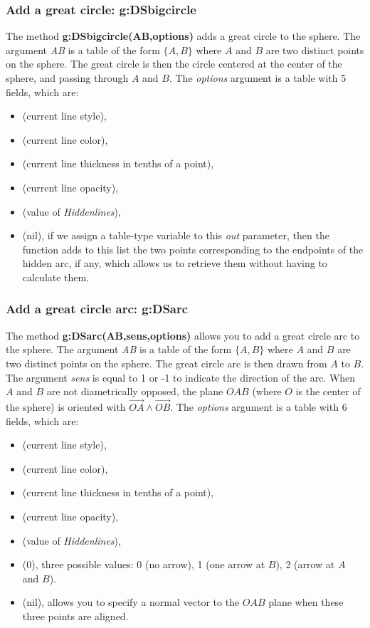 \subsubsection{Add a great circle: g:DSbigcircle}

The method \textbf{g:DSbigcircle(AB,options)} adds a great circle to the sphere. The argument \emph{AB} is a table of the form $\{A,B\}$ where $A$ and $B$ are two distinct points on the sphere. The great circle is then the circle centered at the center of the sphere, and passing through $A$ and $B$. The \emph{options} argument is a table with 5 fields, which are:
\begin{itemize}
    \item {} (current line style),
    \item {} (current line color),
    \item {} (current line thickness in tenths of a point),
    \item {} (current line opacity),
    \item {} (value of \emph{Hiddenlines}),
    \item {} (nil), if we assign a table-type variable to this \emph{out} parameter, then the function adds to this list the two points corresponding to the endpoints of the hidden arc, if any, which allows us to retrieve them without having to calculate them. \end{itemize}

\subsubsection{Add a great circle arc: g:DSarc}

The method \textbf{g:DSarc(AB,sens,options)} allows you to add a great circle arc to the sphere. The argument \emph{AB} is a table of the form $\{A,B\}$ where $A$ and $B$ are two distinct points on the sphere. The great circle arc is then drawn from $A$ to $B$. The argument \emph{sens} is equal to 1 or -1 to indicate the direction of the arc. When $A$ and $B$ are not diametrically opposed, the plane $OAB$ (where $O$ is the center of the sphere) is oriented with $\vec{OA}\wedge\vec{OB}$. The \emph{options} argument is a table with 6 fields, which are:
\begin{itemize}
    \item {} (current line style),
    \item {} (current line color),
    \item {} (current line thickness in tenths of a point),
    \item {} (current line opacity),
    \item {} (value of \emph{Hiddenlines}),
    \item {} (0), three possible values: 0 (no arrow), 1 (one arrow at $B$), 2 (arrow at $A$ and $B$).
    \item {} (nil), allows you to specify a normal vector to the $OAB$ plane when these three points are aligned.
\end{itemize}

